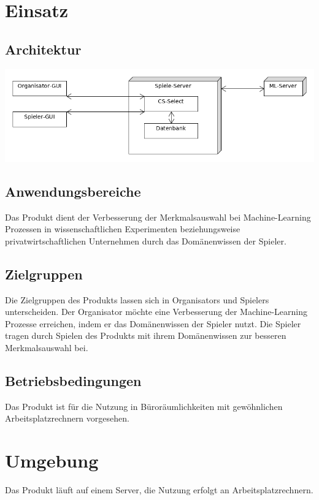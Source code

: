 \documentclass[a4paper]{scrreprt}
\begin{document}
    \chapter{Einsatz}

    \section{Architektur}
    \includegraphics[width=\textwidth]{uml/export/Architektur.png}
    \section{Anwendungsbereiche}
    Das \Gls{Produkt} dient der Verbesserung der Merkmalsauswahl bei Machine-Learning Prozessen in wissenschaftlichen
    Experimenten beziehungsweise privatwirtschaftlichen Unternehmen durch das Domänenwissen der \Gls{Spieler}.

    \section{Zielgruppen}
    Die Zielgruppen des \Gls{Produkt}s lassen sich in \Glspl{Organisator} und \Glspl{Spieler} unterscheiden.
    Der \Gls{Organisator} möchte eine Verbesserung der Machine-Learning Prozesse erreichen, indem er das Domänenwissen der \Gls{Spieler} nutzt.
    Die \Gls{Spieler} tragen durch Spielen des \Gls{Produkt}s mit ihrem Domänenwissen zur besseren Merkmalsauswahl bei.


    \section{Betriebsbedingungen}
    Das \Gls{Produkt} ist für die Nutzung in Büroräumlichkeiten mit gewöhnlichen Arbeitsplatzrechnern vorgesehen.

    \chapter{Umgebung}
    Das \Gls{Produkt} läuft auf einem Server, die Nutzung erfolgt an Arbeitsplatzrechnern.
\end{document}
